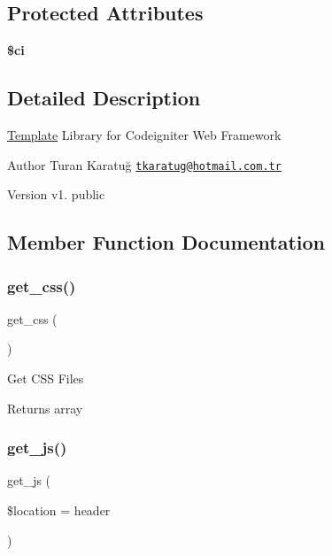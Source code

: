 \subsection*{Protected Attributes}
\begin{DoxyCompactItemize}
\item 
\mbox{\label{class_template_aa5729f4723026a91e459ebeda8e1176d}} 
{\bfseries \$ci}
\end{DoxyCompactItemize}


\subsection{Detailed Description}
\mbox{\hyperlink{class_template}{Template}} Library for Codeigniter Web Framework

\begin{DoxyAuthor}{Author}
Turan Karatuğ \href{mailto:tkaratug@hotmail.com.tr}{\tt tkaratug@hotmail.\+com.\+tr} 
\end{DoxyAuthor}
\begin{DoxyVersion}{Version}
v1.  public 
\end{DoxyVersion}


\subsection{Member Function Documentation}
\mbox{\label{class_template_a704742c49a6f5c1546998619d37188cb}} 
\subsubsection{\texorpdfstring{get\+\_\+css()}{get\_css()}}
{\footnotesize\ttfamily get\+\_\+css (\begin{DoxyParamCaption}{ }\end{DoxyParamCaption})}

Get C\+SS Files \begin{DoxyReturn}{Returns}
array 
\end{DoxyReturn}
\mbox{\label{class_template_a42620c35787667d0a7fbda7473886ccf}} 
\subsubsection{\texorpdfstring{get\+\_\+js()}{get\_js()}}
{\footnotesize\ttfamily get\+\_\+js (\begin{DoxyParamCaption}\item[{}]{\$location = {\ttfamily \textquotesingle{}header\textquotesingle{}} }\end{DoxyParamCaption})}

